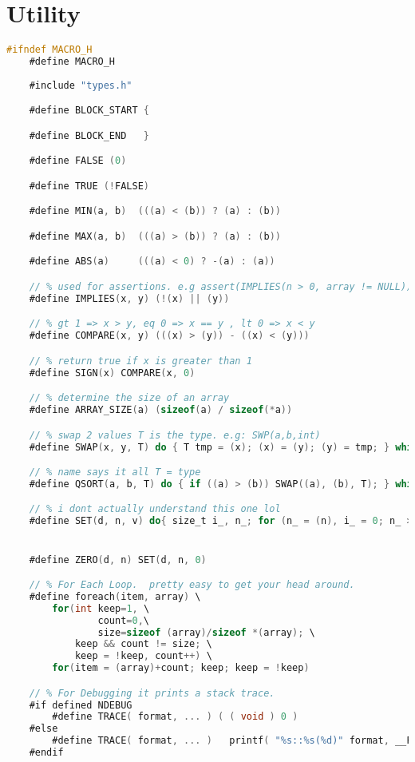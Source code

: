 \documentclass[fancychapters]{report}   	%
\begin{document}
\section{Utility}
\begin{lstlisting}[language=C,caption={macros.h}]
#ifndef MACRO_H
    #define MACRO_H
    
    #include "types.h"

    #define BLOCK_START {

    #define BLOCK_END   }

    #define FALSE (0)

    #define TRUE (!FALSE)

    #define MIN(a, b)  (((a) < (b)) ? (a) : (b))

    #define MAX(a, b)  (((a) > (b)) ? (a) : (b))

    #define ABS(a)	   (((a) < 0) ? -(a) : (a))

    // % used for assertions. e.g assert(IMPLIES(n > 0, array != NULL));
    #define IMPLIES(x, y) (!(x) || (y))

    // % gt 1 => x > y, eq 0 => x == y , lt 0 => x < y
    #define COMPARE(x, y) (((x) > (y)) - ((x) < (y)))

    // % return true if x is greater than 1
    #define SIGN(x) COMPARE(x, 0)

    // % determine the size of an array
    #define ARRAY_SIZE(a) (sizeof(a) / sizeof(*a))

    // % swap 2 values T is the type. e.g: SWP(a,b,int)
    #define SWAP(x, y, T) do { T tmp = (x); (x) = (y); (y) = tmp; } while(0)

    // % name says it all T = type
    #define QSORT(a, b, T) do { if ((a) > (b)) SWAP((a), (b), T); } while (0)

    // % i dont actually understand this one lol
    #define SET(d, n, v) do{ size_t i_, n_; for (n_ = (n), i_ = 0; n_ > 0; --n_, ++i_) (d)[i_] = (v); } while(0)


    #define ZERO(d, n) SET(d, n, 0)

    // % For Each Loop.  pretty easy to get your head around.
    #define foreach(item, array) \
        for(int keep=1, \
                count=0,\
                size=sizeof (array)/sizeof *(array); \
            keep && count != size; \
            keep = !keep, count++) \
        for(item = (array)+count; keep; keep = !keep)

    // % For Debugging it prints a stack trace.
    #if defined NDEBUG
        #define TRACE( format, ... ) ( ( void ) 0 )
    #else
        #define TRACE( format, ... )   printf( "%s::%s(%d)" format, __FILE__, __FUNCTION__,  __LINE__, __VA_ARGS__ )
    #endif


\end{lstlisting}
\end{document}
